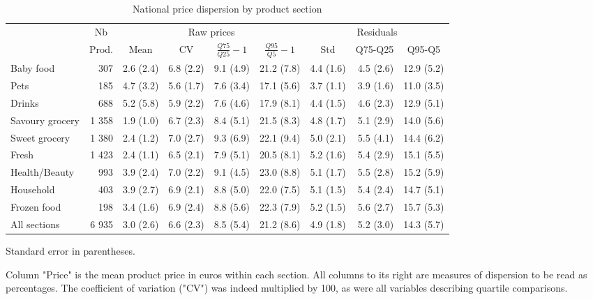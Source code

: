 \documentclass[english]{article}
\begin{document}
\begin{table}[htbp]
\begin{threeparttable}
\caption{National price dispersion by product section}
\label{tab:stats_nat_dispersion}
\small
\begin{tabular}{lr|rrrr|rrr}
    \toprule
    \toprule
          & \multicolumn{1}{c|}{Nb} & \multicolumn{4}{c|}{Raw prices} & \multicolumn{3}{c}{Residuals} \\
          & \multicolumn{1}{c|}{Prod.} & \multicolumn{1}{c}{Mean} & \multicolumn{1}{c}{CV} & \multicolumn{1}{c}{$\frac{Q75}{Q25}-1$} & \multicolumn{1}{c|}{$\frac{Q95}{Q5}-1$} & \multicolumn{1}{c}{Std} & \multicolumn{1}{c}{Q75-Q25} & \multicolumn{1}{c}{Q95-Q5} \\
    \midrule
    Baby food &  307  & 2.6 (2.4) & 6.8 (2.2) & 9.1 (4.9) & 21.2 (7.8) & 4.4 (1.6) & 4.5 (2.6) & 12.9 (5.2) \\
    Pets  &  185  & 4.7 (3.2) & 5.6 (1.7) & 7.6 (3.4) & 17.1 (5.6) & 3.7 (1.1) & 3.9 (1.6) & 11.0 (3.5) \\
    Drinks &  688  & 5.2 (5.8) & 5.9 (2.2) & 7.6 (4.6) & 17.9 (8.1) & 4.4 (1.5) & 4.6 (2.3) & 12.9 (5.1) \\
    Savoury grocery & 1 358 & 1.9 (1.0) & 6.7 (2.3) & 8.4 (5.1) & 21.5 (8.3) & 4.8 (1.7) & 5.1 (2.9) & 14.0 (5.6) \\
    Sweet grocery & 1 380 & 2.4 (1.2) & 7.0 (2.7) & 9.3 (6.9) & 22.1 (9.4) & 5.0 (2.1) & 5.5 (4.1) & 14.4 (6.2) \\
    Fresh & 1 423 & 2.4 (1.1) & 6.5 (2.1) & 7.9 (5.1) & 20.5 (8.1) & 5.2 (1.6) & 5.4 (2.9) & 15.1 (5.5) \\
    Health/Beauty &  993  & 3.9 (2.4) & 7.0 (2.2) & 9.1 (4.5) & 23.0 (8.8) & 5.1 (1.7) & 5.5 (2.8) & 15.2 (5.9) \\
    Household &  403  & 3.9 (2.7) & 6.9 (2.1) & 8.8 (5.0) & 22.0 (7.5) & 5.1 (1.5) & 5.4 (2.4) & 14.7 (5.1) \\
    Frozen food &  198  & 3.4 (1.6) & 6.9 (2.4) & 8.8 (5.6) & 22.3 (7.9) & 5.2 (1.5) & 5.6 (2.7) & 15.7 (5.3) \\
    \midrule
    All sections & 6 935 & 3.0 (2.6) & 6.6 (2.3) & 8.5 (5.4) & 21.2 (8.6) & 4.9 (1.8) & 5.2 (3.0) & 14.3 (5.7) \\
    \bottomrule
    \bottomrule
\end{tabular}
\begin{tablenotes}
      \small
			\item Standard error in parentheses.
      \item Column "Price" is the mean product price in euros within each section. All columns to its right are measures of dispersion to be read as percentages. The coefficient of variation ("CV") was indeed multiplied by 100, as were all variables describing quartile comparisons.
\end{tablenotes}
\end{threeparttable}
\end{table}
\end{document}
